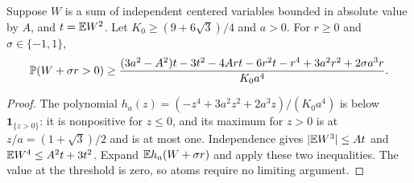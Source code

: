 \begin{lemma}\label{ms:fourier:cut49:shortloc:quartic}
Suppose $W$ is a sum of independent centered variables bounded in absolute
value by $A$, and $t=\mathbb E W^2$. Let $K_0\ge(9+6\sqrt3)/4$ and $a>0$.
For $r\ge0$ and $\sigma\in\{-1,1\}$,
\begin{equation}\label{ms:fourier:cut49:shortloc:quarticformula}
 \mathbb P(W+\sigma r>0)\ge
 \frac{(3a^2-A^2)t-3t^2-4Art-6r^2t-r^4
                      +3a^2r^2+2\sigma a^3r}{K_0a^4}.
\end{equation}
\end{lemma}
\begin{proof}
The polynomial $h_a(z)=(-z^4+3a^2z^2+2a^3z)/(K_0a^4)$ is below
$\mathbf1_{\{z>0\}}$: it is nonpositive for $z\le0$, and its maximum for
$z>0$ is at $z/a=(1+\sqrt3)/2$ and is at most one. Independence gives
$|\mathbb E W^3|\le At$ and $\mathbb E W^4\le A^2t+3t^2$.
Expand $\mathbb E h_a(W+\sigma r)$ and apply these two inequalities.
The value at the threshold is zero, so atoms require no limiting argument.
\end{proof}

